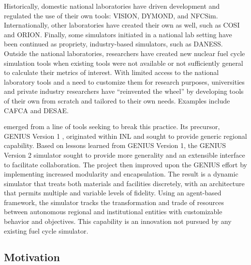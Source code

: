 Historically, domestic national laboratories have driven development and
regulated the use of their own tools:
\gls{VISION}\cite{jacobson_verifiable_2010},
\gls{DYMOND}\cite{yacout_modeling_2005}, and
\gls{NFCSim}\cite{schneider_nfcsim:_2005,allan_guidance_2008}.  Internationally,
other laboratories have created their own as well, such as
\gls{COSI}\cite{boucher_cosi_2005,boucher_cosi:_2006,meyer_new_2009,coquelet-pascal_comparison_2011}
and ORION\cite{worrall_scenario_2007}.  Finally, some simulators initiated in a national lab setting have
been continued as propriety, industry-based simulators, such as
\gls{DANESS}\cite{van_den_durpel_daness_2009}.  Outside the national laboratories,
researchers have created new nuclear fuel cycle simulation tools when existing
tools were not available or not sufficiently general to calculate their metrics
of interest.  With limited access to the
national laboratory tools and a need to customize them for research purposes,
universities and private industry researchers have ``reinvented the wheel'' by
developing tools of their own from scratch and tailored to their own needs.
Examples include \gls{CAFCA}\cite{guerin_benchmark_2009} and
\gls{DESAE}\cite{andrianova_desae_2008,mccarthy_benchmark_2012,allan_guidance_2008}.

\Cyclus emerged from a line of tools seeking to break this practice.  Its
precursor, \gls{GENIUS} Version 1
\cite{dunzik-gougar_global_2007,jain_transitioning_2006}, originated within
\gls{INL} and sought to provide generic regional capability.  Based on lessons
learned from \gls{GENIUS} Version 1, the \gls{GENIUS} Version 2
\cite{oliver_studying_2009,huff_geniusv2_2009} simulator sought to provide more
generality and an extensible interface to facilitate collaboration.  The \Cyclus
project then improved upon the \gls{GENIUS} effort by implementing increased
modularity and encapsulation.  The result is a dynamic simulator that treats
both materials and facilities discretely, with an architecture that permits
multiple and variable levels of fidelity. Using an agent-based framework, the
simulator tracks the transformation and trade of resources between autonomous
regional and institutional entities with customizable behavior and
objectives. This capability is an innovation not pursued by any existing fuel
cycle simulator.


\subsection{Motivation}

